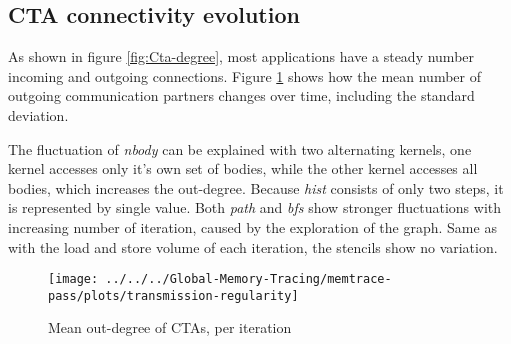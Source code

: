 \subsection{CTA connectivity evolution}
As shown in figure \ref{fig:Cta-degree}, most applications have a steady number incoming and outgoing connections. Figure \ref{philandering} shows how the mean number of outgoing communication partners changes over time, including the standard deviation. 

The fluctuation of \textit{nbody} can be explained with two alternating kernels, one kernel accesses only it's own set of bodies, while the other kernel accesses all bodies, which increases the out-degree. Because \textit{hist} consists of only two steps, it is represented by single value. Both \textit{path} and \textit{bfs} show stronger fluctuations with increasing number of iteration, caused by the exploration of the graph. Same as with the load and store volume of each iteration, the stencils show no variation.

\begin{figure}[h!]
	\centering
		\texttt{[image: ../../../Global-Memory-Tracing/memtrace-pass/plots/transmission-regularity]}
	\caption{Mean out-degree of CTAs, per iteration}
	\label{philandering}
\end{figure}